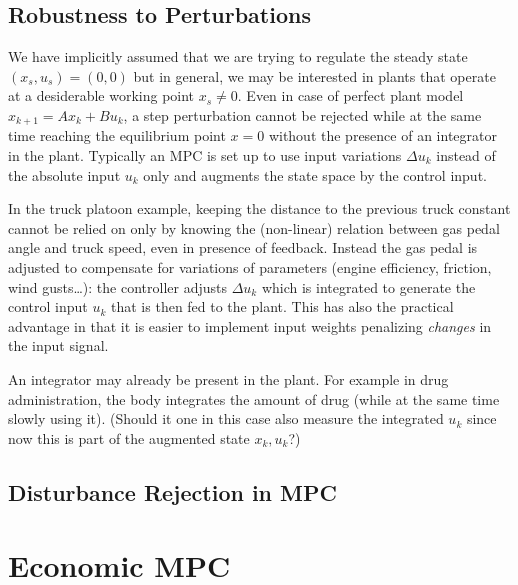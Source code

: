 \documentclass[11pt]{report}
\begin{document}
\subsection{Robustness to Perturbations}
\label{sec:robustness-to-perturbations}

We have implicitly assumed that we are trying to regulate the steady state $(x_s,u_s) = (0,0)$ but in general, we may be interested in plants that operate at a desiderable working point $x_s\neq 0$. Even in case of perfect plant model $x_{k+1} = Ax_k+Bu_k$, a step perturbation cannot be rejected while at the same time reaching the equilibrium point $x=0$ without the presence of an integrator in the plant. Typically an MPC is set up to use input variations $\Delta u_k$ instead of the absolute input $u_k$ only and augments the state space by the control input.

In the truck platoon example, keeping the distance to the previous truck constant cannot be relied on only by knowing the (non-linear) relation between gas pedal angle and truck speed, even in presence of feedback. Instead the gas pedal is adjusted to compensate for variations of parameters (engine efficiency, friction, wind gusts\ldots): the controller adjusts $\Delta u_k$ which is integrated to generate the control input $u_k$ that is then fed to the plant. This has also the practical advantage in that it is easier to implement input weights penalizing \emph{changes} in the input signal.

An integrator may already be present in the plant. For example in drug administration, the body integrates the amount of drug (while at the same time slowly using it). (Should it one in this case also measure the integrated $u_k$ since now this is part of the augmented state $x_k,u_k$?)

\subsection{Disturbance Rejection in MPC}
\label{sec:disturbance-rejection}



\section{Economic MPC}
\label{sec:economic-mpc}
\end{document}
